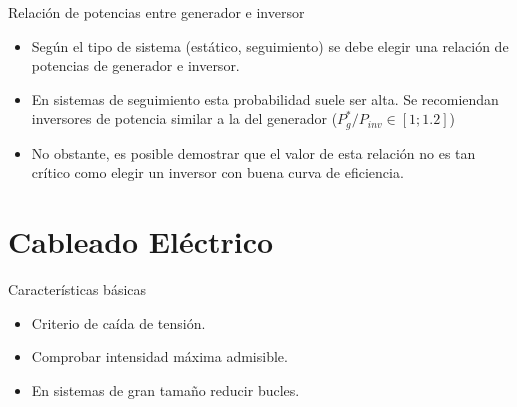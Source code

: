 \documentclass[aspectratio=169, usenames,svgnames,dvipsnames]{beamer}
\begin{document}
\begin{frame}[label={sec:orgce48891}]{Relación de potencias entre generador e inversor}
\begin{itemize}
\item Según el \alert{tipo de sistema} (estático, seguimiento) se debe elegir una relación de potencias de generador e inversor.

\item En \alert{sistemas de seguimiento} esta probabilidad suele ser alta. Se recomiendan inversores de potencia similar a la del generador  (\(P_{g}^{*}/P_{inv}\in\left[1;1.2\right]\))

\item No obstante, es posible demostrar que el valor de esta relación no es tan crítico como \alert{elegir un inversor con buena curva de eficiencia}.
\end{itemize}
\end{frame}

\section{Cableado Eléctrico}
\label{sec:org1f6ee16}

\begin{frame}[label={sec:org4c1fa7d}]{Características básicas}
\begin{itemize}
\item Criterio de caída de tensión.

\item Comprobar intensidad máxima admisible.

\item En sistemas de gran tamaño reducir bucles.
\end{itemize}
\end{frame}
\end{document}
